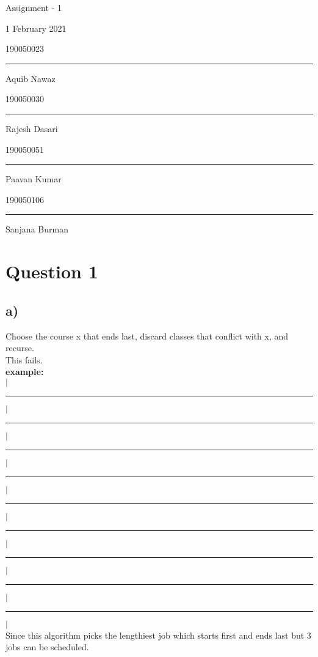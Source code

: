 \documentclass{report}
\begin{document}
 \null
 \begin{center}%
  {\LARGE Assignment - 1\par}%
 \end{center}%
 \par
 \begin{center}%
  {\LARGE 1 February 2021 \par}%
 \end{center}%
 \begin{center}%
  {\large 190050023 \rule[0.5mm]{1cm}{0pt} Aquib Nawaz\par}%
 \end{center}%
 \begin{center}%
  {\large 190050030 \rule[0.5mm]{0.9cm}{0pt} Rajesh Dasari\par}%
 \end{center}%
 \begin{center}%
  {\large 190050051 \rule[0.5mm]{0.8cm}{0pt}Paavan Kumar\par}%
 \end{center}%
 \begin{center}%
  {\large 190050106 \rule[0.5mm]{0.4cm}{0pt} Sanjana Burman\par}%
 \end{center}%
 \section*{Question 1}
 \subsection*{a)}
 Choose the course x that ends last, discard classes that conflict with x, and recurse.\\
 This fails.\\
 \textbf{example:} \\
  $|$\noindent\rule[0.5mm]{8cm}{0.4pt}$|$\\
  \noindent\rule[0.5mm]{2cm}{0pt}$|$\noindent\rule[0.5mm]{2cm}{0.4pt}$|$\noindent\rule[0.5mm]{1cm}{0pt}$|$\noindent\rule[0.5mm]{2cm}{0.4pt}$|$\\
  \noindent\rule[0.5mm]{0.5cm}{0pt}$|$\noindent\rule[0.5mm]{3cm}{0.4pt}$|$\noindent\rule[0.5mm]{3.75cm}{0pt}$|$\noindent\rule[0.5mm]{0.5cm}{0.4pt}$|$\\
 Since this algorithm picks the lengthiest job which starts first and ends last but 3 jobs can be scheduled.
\end{document}

